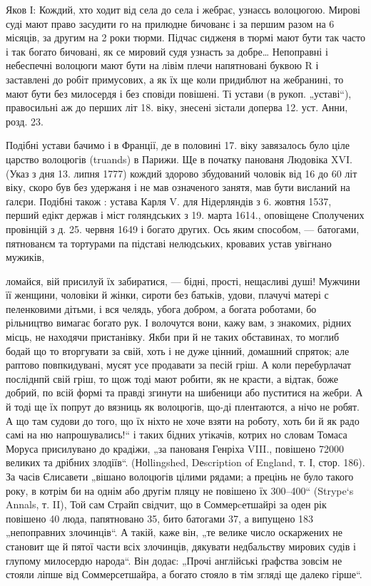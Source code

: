 Яков І: Кождий, хто ходит від села до села і жебрає,
узнаєсь волоцюгою. Мирові суді мают право засудити го на
прилюдне бичованє і за першим разом на 6 місяців, за
другим на 2 роки тюрми. Підчас сидженя в тюрмі мают
бути так часто і так богато бичовані, як се мировий судя
узнасть за добре\dots{} Непоправні і небеспечні волоцюги мают
бути на лівім плечи напятновані буквою R і заставлені до
робіт примусових, а як їх ще коли придиблют на жебранині,
то мают бути без милосердя і без сповіди повішені. Ті устави
(в рукоп. „уставі“), правосильні аж до перших літ 18. віку,
знесені зістали доперва 12. уст. Анни, розд. 23.

Подібні устави бачимо і в Франції, де в половині 17.
віку завязалось було ціле царство волоцюгів (truands) в Парижи.
Ще в початку панованя Людовіка XVI. (Указ з дня
13. липня 1777) кождий здорово збудований чоловік від 16
до 60 літ віку, скоро був без удержаня і не мав означеного
занятя, мав бути висланий на ґалєри. Подібні також : устава
Карля V. для Нідерляндів з 6. жовтня 1537, перший едікт
держав і міст голяндських з 19. марта 1614., оповіщене Сполучених
провінцій з д. 25. червня 1649 і богато других.
Ось яким способом, — батогами, пятнованєм та тортурами
па підставі нелюдських, кровавих устав увігнано мужиків,

ломайся, вій присилуй їх забиратися, — бідні, прості, нещасливі душі!
Мужчини її женщини, чоловіки й жінки, сироти без батьків, удови, плачучі
матері с пеленковими дітьми, і вся челядь, убога добром, а богата
роботами, бо рільництво вимагає богато рук. І волочутся вони, кажу вам,
з знакомих, рідних місць, не находячи пристанівку. Якби при й не таких
обставинах, то моглиб бодай що то вторгувати за свій, хоть і не дуже
цінний, домашний спряток; але раптово повпкидувані, мусят усе продавати
за песій гріш. А коли перебурлачат посліднпй свій гріш, то щож
тоді мают робити, як не красти, а відтак, боже добрий, по всій формі та
правді згинути на шибеници або пуститися на жебри. А й тоді ще їх
попрут до вязниць як волоцюгів, що-ді плентаются, а нічо не робят.
А що там судови до того, що їх ніхто не хоче взяти на роботу, хоть би
й як радо самі на ню напрошувались!“ і таких бідних утікачів, котрих
но словам Томаса Моруса присилувано до крадіжи, „за панованя Генріха
VIII., повішено 72000 великих та дрібних злодіїв“. (Ноllingshed, Dеscription
of England, т. І, стор. 186). За часів Єлисавети „вішано волоцюгів
цілими рядами; а прецінь не було такого року, в котрім би на
однім або другім пляцу не повішено їх 300--400“ (Strype`s Annals, т. II),
Той сам Страйп свідчит, що в Соммерcетшайрі за оден рік повішено 40
люда, папятновано 35, бито батогами 37, а випущено 183 „непоправних
злочинців“. А такій, каже він, „те велике число оскаржених не становит
ще й пятої части всіх злочинців, дякувати недбальству мирових судів
і глупому милосердю народа“. Він додає: „Прочі англійські ґрафства
зовсім не стояли ліпше від Соммерсетшайра, а богато стояло в тім згляді
ще далеко гірше“.
\parbreak{}
